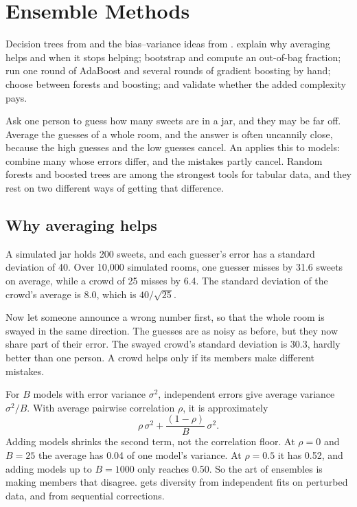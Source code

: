 \chapter{Ensemble Methods}
\label{ch:ensembles}

\chapterguide%
  {Decision trees from  and the bias--variance ideas from .}
  {explain why averaging helps and when it stops helping; bootstrap and compute an out-of-bag fraction; run one round of AdaBoost and several rounds of gradient boosting by hand; choose between forests and boosting; and validate whether the added complexity pays.}

Ask one person to guess how many sweets are in a jar, and they may be far off. Average the guesses of a whole room, and the answer is often uncannily close, because the high guesses and the low guesses cancel. An  applies this to models: combine many whose errors differ, and the mistakes partly cancel. Random forests and boosted trees are among the strongest tools for tabular data, and they rest on two different ways of getting that difference.

\section{Why averaging helps}

\begin{workedexample}
A simulated jar holds 200 sweets, and each guesser's error has a standard deviation of 40. Over 10,000 simulated rooms, one guesser misses by 31.6 sweets on average, while a crowd of 25 misses by 6.4. The standard deviation of the crowd's average is 8.0, which is $40/\sqrt{25}$.

Now let someone announce a wrong number first, so that the whole room is swayed in the same direction. The guesses are as noisy as before, but they now share part of their error. The swayed crowd's standard deviation is 30.3, hardly better than one person. A crowd helps only if its members make different mistakes.
\end{workedexample}

For $B$ models with error variance $\sigma^2$, independent errors give average variance $\sigma^2/B$. With average pairwise correlation $\rho$, it is approximately
\[
  \rho\,\sigma^2+\frac{(1-\rho)}{B}\,\sigma^2 .
\]
Adding models shrinks the second term, not the correlation floor. At $\rho=0$ and $B=25$ the average has 0.04 of one model's variance. At $\rho=0.5$ it has 0.52, and adding models up to $B=1000$ only reaches 0.50. So the art of ensembles is making members that disagree.  gets diversity from independent fits on perturbed data, and  from sequential corrections.

